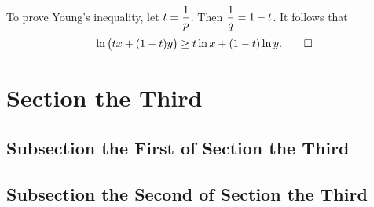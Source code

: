 To prove Young's inequality, let \(\displaystyle t = \frac{1}{p}\). Then \(\displaystyle
\frac{1}{q} = 1 - t\). It follows that
\[
    \ln \big(t x + (1 - t) y \big) \ge t \ln x + (1 - t) \ln y. \qedhere
\]
\Epr

\section{Section the Third}

\kant[21-22]

\Bxr[Euler]
\kant[23]
\Exr

\kant[24-25]

\subsection{Subsection the First of Section the Third}

\kant[26-27]

\Bpr
\kant[28]
\Epr

\kant[29-30]

\subsection{Subsection the Second of Section the Third}

\kant[31-32]

\Bsl[Riemann]
\kant[33]
\Esl

\kant[34-35]

\Edc